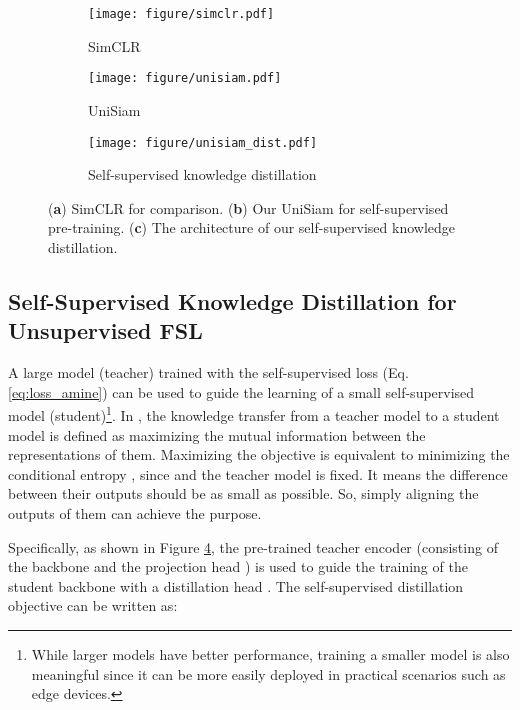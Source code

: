 \documentclass[runningheads]{llncs}
\begin{document}
\begin{figure}[t]
    \centering  
    \begin{subfigure}{0.24\linewidth}
    \centering
    \texttt{[image: figure/simclr.pdf]}
    \caption{\label{fig:simclr}SimCLR \cite{chen2020a}}
    \end{subfigure}
    \hfill
    \begin{subfigure}{0.24\linewidth}
    \centering
    \texttt{[image: figure/unisiam.pdf]}
    \caption{\label{fig:unisiam}UniSiam}
    \end{subfigure}
    \hfill
    \begin{subfigure}{0.5\linewidth}
      \centering
    \texttt{[image: figure/unisiam\_dist.pdf]}
    \caption{\label{fig:dist}Self-supervised knowledge distillation}
    \end{subfigure}
    \caption{(\textbf{a}) SimCLR \cite{chen2020a} for comparison. (\textbf{b}) Our UniSiam for self-supervised pre-training. (\textbf{c}) The architecture of our self-supervised knowledge distillation. }
\end{figure}

\subsection{Self-Supervised Knowledge Distillation for Unsupervised FSL\label{sec:method_dist}}

A large model (teacher) trained with the self-supervised loss (Eq. \ref{eq:loss_amine}) can be used to guide the learning of a small self-supervised model (student)\footnote{While larger models have better performance, training a smaller model is also meaningful since it can be more easily deployed in practical scenarios such as edge devices.}. 
In \cite{tian2020contrastive}, the knowledge transfer from a teacher model to a student model is defined as maximizing the mutual information  between the representations of them. 
Maximizing the objective is equivalent to minimizing the conditional entropy , since  and the teacher model is fixed. 
It means the difference between their outputs should be as small as possible. 
So, simply aligning the outputs of them can achieve the purpose. 

Specifically, as shown in Figure \ref{fig:dist}, the pre-trained teacher encoder  (consisting of the backbone  and the projection head ) is used to guide the training of the student backbone  with a distillation head . The self-supervised distillation objective can be written as:
\begin{footnotesize}

\end{footnotesize}
\end{document}
